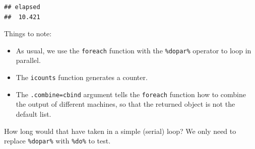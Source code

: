 \documentclass[]{book}
\newenvironment{Shaded}{\begin{snugshade}}{\end{snugshade}}
\newcommand{\KeywordTok}[1]{\textcolor[rgb]{0.13,0.29,0.53}{\textbf{#1}}}
\newcommand{\DataTypeTok}[1]{\textcolor[rgb]{0.13,0.29,0.53}{#1}}
\newcommand{\DecValTok}[1]{\textcolor[rgb]{0.00,0.00,0.81}{#1}}
\newcommand{\FloatTok}[1]{\textcolor[rgb]{0.00,0.00,0.81}{#1}}
\newcommand{\StringTok}[1]{\textcolor[rgb]{0.31,0.60,0.02}{#1}}
\newcommand{\OtherTok}[1]{\textcolor[rgb]{0.56,0.35,0.01}{#1}}
\newcommand{\OperatorTok}[1]{\textcolor[rgb]{0.81,0.36,0.00}{\textbf{#1}}}
\newcommand{\NormalTok}[1]{#1}
\providecommand{\tightlist}{%
  \setlength{\itemsep}{0pt}\setlength{\parskip}{0pt}}
\theoremstyle{definition}
\theoremstyle{definition}
\theoremstyle{definition}
\theoremstyle{remark}
\begin{document}
\begin{Shaded}
\end{Shaded}

\begin{verbatim}
## elapsed 
##  10.421
\end{verbatim}

Things to note:

\begin{itemize}
\tightlist
\item
  As usual, we use the \texttt{foreach} function with the
  \texttt{\%dopar\%} operator to loop in parallel.
\item
  The \texttt{icounts} function generates a counter.
\item
  The \texttt{.combine=cbind} argument tells the \texttt{foreach}
  function how to combine the output of different machines, so that the
  returned object is not the default list.
\end{itemize}

How long would that have taken in a simple (serial) loop? We only need
to replace \texttt{\%dopar\%} with \texttt{\%do\%} to test.
\end{document}
